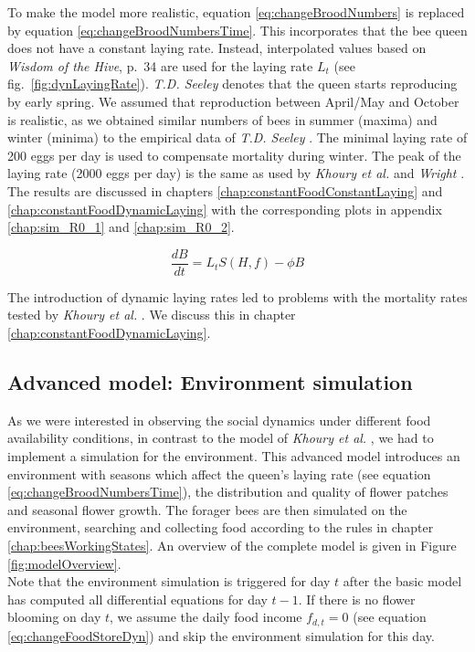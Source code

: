 		To make the model more realistic, equation \ref{eq:changeBroodNumbers} is replaced by equation \ref{eq:changeBroodNumbersTime}. This incorporates that the bee queen does not have a constant laying rate. Instead, interpolated values based on \textit{Wisdom of the Hive}, p.~34 \cite{seeley95} are used for the laying rate $L_t$ (see fig.~\ref{fig:dynLayingRate}). \textit{T.D. Seeley} denotes that the queen starts reproducing by early spring. We assumed that reproduction between April/May and October is realistic, as we obtained similar numbers of bees in summer (maxima) and winter (minima) to the empirical data of \textit{T.D. Seeley} \cite{seeley95}. The minimal laying rate of 200 eggs per day is used to compensate mortality during winter. The peak of the laying rate (2000 eggs per day) is the same as used by \textit{Khoury et al.} \cite{khoury13} and \textit{Wright} \cite{wright08}. The results are discussed in chapters \ref{chap:constantFoodConstantLaying} and \ref{chap:constantFoodDynamicLaying} with the corresponding plots in appendix \ref{chap:sim_R0_1} and \ref{chap:sim_R0_2}.
		
		\begin{equation}\label{eq:changeBroodNumbersTime}
			\frac{dB}{dt} = L_tS(H,f)-\phi B
		\end{equation}
		
		The introduction of dynamic laying rates led to problems with the mortality rates tested by \textit{Khoury et al.} \cite{khoury13}. We discuss this in chapter \ref{chap:constantFoodDynamicLaying}.
	
	\subsection{Advanced model: Environment simulation}
		\label{chap:advancedModel}
		

		As we were interested in observing the social dynamics under different food availability conditions, in contrast to the model of \textit{Khoury et al.} \cite{khoury13}, we had to implement a simulation for the environment. This advanced model introduces an environment with seasons which affect the queen's laying rate (see equation \ref{eq:changeBroodNumbersTime}), the distribution and quality of flower patches and seasonal flower growth.
		The forager bees are then simulated on the environment, searching and collecting food according to the rules in chapter \ref{chap:beesWorkingStates}. An overview of the complete model is given in Figure \ref{fig:modelOverview}.\\
		 Note that the environment simulation is triggered for day $t$ after the basic model has computed all differential equations for day $t-1$. If there is no flower blooming on day $t$, we assume the daily food income $f_{d,t} = 0$ (see equation \ref{eq:changeFoodStoreDyn}) and skip the environment simulation for this day.
		
